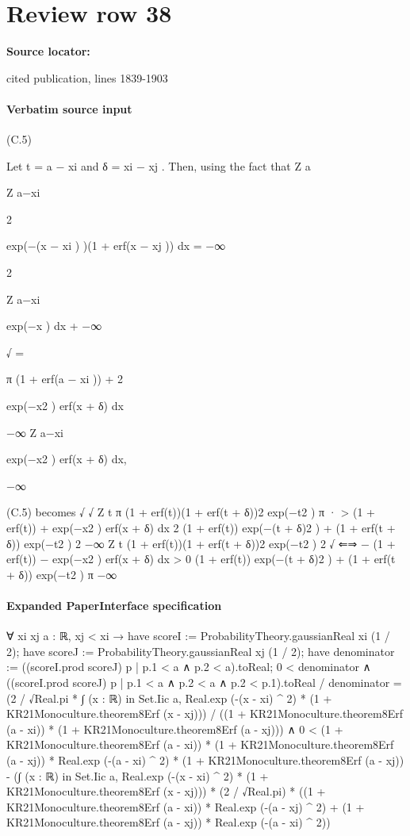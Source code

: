 \documentclass[10pt]{article}
\begin{document}
\section*{Review row 38}
\textbf{Source locator:} {\footnotesize\raggedright cited publication, lines 1839-\allowbreak{}1903\par}
\paragraph{Verbatim source input}
\begin{ReviewVerbatim}
(C.5)

Let t = a − xi and δ = xi − xj . Then, using the fact that
Z a

Z a−xi

2

exp(−(x − xi ) )(1 + erf(x − xj )) dx =
−∞

2

Z a−xi

exp(−x ) dx +
−∞

√
=

π
(1 + erf(a − xi )) +
2

exp(−x2 ) erf(x + δ) dx

−∞
Z a−xi

exp(−x2 ) erf(x + δ) dx,

−∞

(C.5) becomes
√
√
Z t
π
(1 + erf(t))(1 + erf(t + δ))2 exp(−t2 )
π
·
>
(1
+
erf(t))
+
exp(−x2 ) erf(x + δ) dx
2 (1 + erf(t)) exp(−(t + δ)2 ) + (1 + erf(t + δ)) exp(−t2 )
2
−∞
Z t
(1 + erf(t))(1 + erf(t + δ))2 exp(−t2 )
2
√
⇐⇒
−
(1
+
erf(t))
−
exp(−x2 ) erf(x + δ) dx > 0
(1 + erf(t)) exp(−(t + δ)2 ) + (1 + erf(t + δ)) exp(−t2 )
π −∞
\end{ReviewVerbatim}


\paragraph{Expanded PaperInterface specification}
\begin{ReviewVerbatim}
∀ {xi xj a : ℝ},
  xj < xi →
    have scoreI := ProbabilityTheory.gaussianReal xi (1 / 2);
    have scoreJ := ProbabilityTheory.gaussianReal xj (1 / 2);
    have denominator := ((scoreI.prod scoreJ) {p | p.1 < a ∧ p.2 < a}).toReal;
    0 < denominator ∧
      ((scoreI.prod scoreJ) {p | p.1 < a ∧ p.2 < a ∧ p.2 < p.1}).toReal / denominator =
          (2 / √Real.pi *
              ∫ (x : ℝ) in Set.Iic a, Real.exp (-(x - xi) ^ 2) * (1 + KR21Monoculture.theorem8Erf (x - xj))) /
            ((1 + KR21Monoculture.theorem8Erf (a - xi)) * (1 + KR21Monoculture.theorem8Erf (a - xj))) ∧
        0 <
          (1 + KR21Monoculture.theorem8Erf (a - xi)) * (1 + KR21Monoculture.theorem8Erf (a - xj)) *
                Real.exp (-(a - xi) ^ 2) *
              (1 + KR21Monoculture.theorem8Erf (a - xj)) -
            (∫ (x : ℝ) in Set.Iic a, Real.exp (-(x - xi) ^ 2) * (1 + KR21Monoculture.theorem8Erf (x - xj))) *
                (2 / √Real.pi) *
              ((1 + KR21Monoculture.theorem8Erf (a - xi)) * Real.exp (-(a - xj) ^ 2) +
                (1 + KR21Monoculture.theorem8Erf (a - xj)) * Real.exp (-(a - xi) ^ 2))
\end{ReviewVerbatim}
\end{document}
